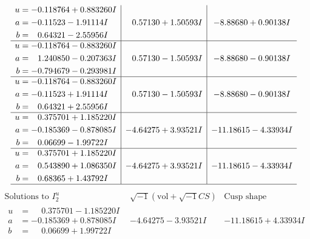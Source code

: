 \documentclass[1p]{elsarticle_modified}
\theoremstyle{definition}
\newcommand{\I}{\sqrt{-1}}
\begin{document}
$$\begin{array}{c|c|c}
\begin{aligned}
u &= -0.118764 + 0.883260 I \\
a &= -0.11523 - 1.91114 I \\
b &= \phantom{-}0.64321 - 2.55956 I\end{aligned}
 & \phantom{-}0.57130 + 1.50593 I & -8.88680 + 0.90138 I \\ \hline\begin{aligned}
u &= -0.118764 - 0.883260 I \\
a &= \phantom{-}1.240850 - 0.207363 I \\
b &= -0.794679 - 0.293981 I\end{aligned}
 & \phantom{-}0.57130 - 1.50593 I & -8.88680 - 0.90138 I \\ \hline\begin{aligned}
u &= -0.118764 - 0.883260 I \\
a &= -0.11523 + 1.91114 I \\
b &= \phantom{-}0.64321 + 2.55956 I\end{aligned}
 & \phantom{-}0.57130 - 1.50593 I & -8.88680 - 0.90138 I \\ \hline\begin{aligned}
u &= \phantom{-}0.375701 + 1.185220 I \\
a &= -0.185369 - 0.878085 I \\
b &= \phantom{-}0.06699 - 1.99722 I\end{aligned}
 & -4.64275 + 3.93521 I & -11.18615 - 4.33934 I \\ \hline\begin{aligned}
u &= \phantom{-}0.375701 + 1.185220 I \\
a &= \phantom{-}0.543890 + 1.086350 I \\
b &= \phantom{-}0.68365 + 1.43792 I\end{aligned}
 & -4.64275 + 3.93521 I & -11.18615 - 4.33934 I\\
 \hline 
 \end{array}$$\newpage$$\begin{array}{c|c|c}  
\text{Solutions to }I^u_{2}& \I (\text{vol} + \sqrt{-1}CS) & \text{Cusp shape}\\
 \hline 
\begin{aligned}
u &= \phantom{-}0.375701 - 1.185220 I \\
a &= -0.185369 + 0.878085 I \\
b &= \phantom{-}0.06699 + 1.99722 I\end{aligned}
 & -4.64275 - 3.93521 I & -11.18615 + 4.33934 I \\ \hline\begin{aligned}

\end{aligned}
\end{array}$$
\end{document}
